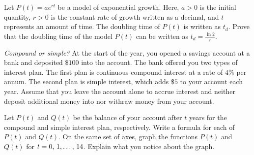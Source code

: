 \documentclass[a4paper,oneside,12pt]{article}
\begin{document}
\begin{problem}
\begin{packedenum}
  \item\label{subprob:logarithm:doubling_time}
    Let $P(t) = a e^{rt}$ be a model of exponential growth.  Here,
    $a > 0$ is the initial quantity, $r > 0$ is the constant rate of
    growth written as a decimal, and $t$ represents an amount of
    time.  The doubling time of $P(t)$ is written as $t_d$.  Prove
    that the doubling time of the model $P(t)$ can be written as
    $t_d = \frac{\ln 2}{r}$.
  \end{packedenum}

\item\emph{Compound or simple?}
  At the start of the year, you opened a savings account at a bank and
  deposited $\$100$ into the account.  The bank offered you two types
  of interest plan.  The first plan is continuous compound interest at
  a rate of $4\%$ per annum.  The second plan is simple interest,
  which adds $\$5$ to your account each year.  Assume that you leave
  the account alone to accrue interest and neither deposit additional
  money into nor withraw money from your account.
  \begin{packedenum}
  \item\label{subprob:logarithm:interest_formulae}
    Let $P(t)$ and $Q(t)$ be the balance of your account after $t$
    years for the compound and simple interest plan, respectively.
    Write a formula for each of $P(t)$ and $Q(t)$.  On the same set of
    axes, graph the functions $P(t)$ and $Q(t)$ for
    $t = {0},\, {1}, \dots,\, {14}$.  Explain what you notice about the graph.


\end{packedenum}
\end{problem}
\end{document}
